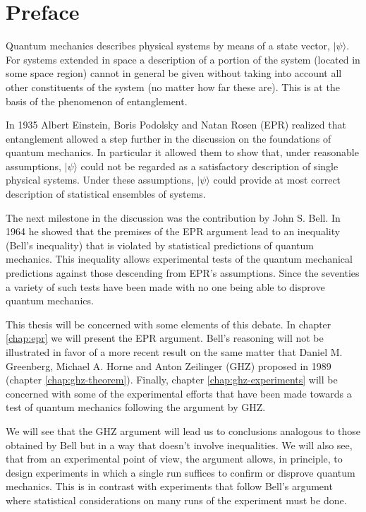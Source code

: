 \chapter*{Preface}
Quantum mechanics describes physical systems by means of a state vector, $| \psi \rangle$. For systems extended in space a description of a portion of the system (located in some space region) cannot in general be given without taking into account all other constituents of the system (no matter how far these are). This is at the basis of the phenomenon of entanglement.

In 1935 Albert Einstein, Boris Podolsky and Natan Rosen (EPR) realized that entanglement allowed a step further in the discussion on the foundations of quantum mechanics. In particular it allowed them to show that, under reasonable assumptions, $| \psi \rangle$ could not be regarded as a satisfactory description of single physical systems. Under these assumptions, $| \psi \rangle$ could provide at most correct description of statistical ensembles of systems.

The next milestone in the discussion was the contribution by John S. Bell. In 1964 he showed that the premises of the EPR argument lead to an inequality (Bell's inequality) that is violated by statistical predictions of quantum mechanics. This inequality allows experimental tests of the quantum mechanical predictions against those descending from EPR's assumptions. Since the seventies a variety of such tests have been made with no one being able to disprove quantum mechanics.

This thesis will be concerned with some elements of this debate. In chapter \ref{chap:epr} we will present the EPR argument. Bell's reasoning will not be illustrated in favor of a more recent result on the same matter that Daniel M. Greenberg, Michael A. Horne and Anton Zeilinger (GHZ) proposed in 1989 (chapter \ref{chap:ghz-theorem}). Finally, chapter \ref{chap:ghz-experiments} will be concerned with some of the experimental efforts that have been made towards a test of quantum mechanics following the argument by GHZ.

We will see that the GHZ argument will lead us to conclusions analogous to those obtained by Bell but in a way that doesn't involve inequalities. We will also see, that from an experimental point of view, the argument allows, in principle, to design experiments in which a single run suffices to confirm or disprove quantum mechanics. This is in contrast with experiments that follow Bell's argument where statistical considerations on many runs of the experiment must be done.
